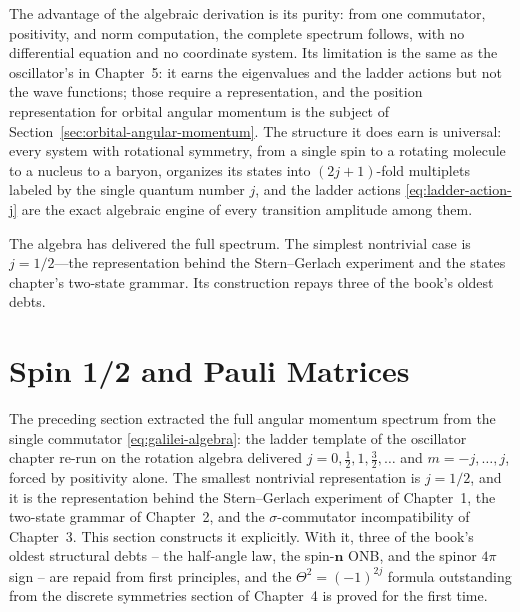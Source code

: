 The advantage of the algebraic derivation is its purity: from one commutator, positivity, and norm computation, the complete spectrum follows, with no differential equation and no coordinate system. Its limitation is the same as the oscillator's in Chapter~5: it earns the eigenvalues and the ladder actions but not the wave functions; those require a representation, and the position representation for orbital angular momentum is the subject of Section~\ref{sec:orbital-angular-momentum}. The structure it does earn is universal: every system with rotational symmetry, from a single spin to a rotating molecule to a nucleus to a baryon, organizes its states into $(2j+1)$-fold multiplets labeled by the single quantum number $j$, and the ladder actions \eqref{eq:ladder-action-j} are the exact algebraic engine of every transition amplitude among them.

The algebra has delivered the full spectrum. The simplest nontrivial case is $j=1/2$---the representation behind the Stern--Gerlach experiment and the states chapter's two-state grammar. Its construction repays three of the book's oldest debts.

\section{Spin 1/2 and Pauli Matrices}
\label{sec:spin-half}

The preceding section extracted the full angular momentum spectrum from the single commutator \eqref{eq:galilei-algebra}: the ladder template of the oscillator chapter re-run on the rotation algebra delivered $j = 0,\frac12,1,\frac32,\ldots$ and $m = -j,\ldots,j$, forced by positivity alone. The smallest nontrivial representation is $j = 1/2$, and it is the representation behind the Stern--Gerlach experiment of Chapter~1, the two-state grammar of Chapter~2, and the $\sigma$-commutator incompatibility of Chapter~3. This section constructs it explicitly. With it, three of the book's oldest structural debts -- the half-angle law, the spin-$\bm n$ ONB, and the spinor $4\pi$ sign -- are repaid from first principles, and the $\Theta^2 = (-1)^{2j}$ formula outstanding from the discrete symmetries section of Chapter~4 is proved for the first time.

